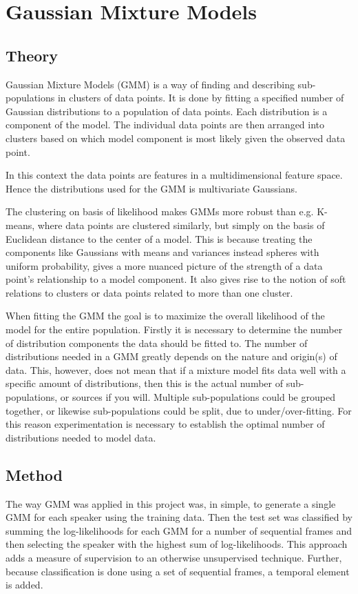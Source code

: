 \chapter{Gaussian Mixture Models}
\section{Theory}

Gaussian Mixture Models (GMM) is a way of finding and describing sub-populations in clusters of data points. 
It is done by fitting a specified number of Gaussian distributions to a population of data points.
Each distribution is a component of the model. 
The individual data points are then arranged into clusters based on which model component is most likely given the observed data point.

In this context the data points are features in a multidimensional feature space. Hence the distributions used for the GMM is multivariate Gaussians.

The clustering on basis of likelihood makes GMMs more robust than e.g. K-means, where data points are clustered similarly, but simply on the basis of Euclidean distance to the center of a model. 
This is because treating the components like Gaussians with means and variances instead spheres with uniform probability, gives a more nuanced picture of the strength of a data point’s relationship to a model component. 
It also gives rise to the notion of soft relations to clusters or data points related to more than one cluster.

When fitting the GMM the goal is to maximize the overall likelihood of the model for the entire population.
Firstly it is necessary to determine the number of distribution components the data should be fitted to. 
The number of distributions needed in a GMM greatly depends on the nature and origin(s)
of data.
This, however, does not mean that if a mixture model fits data well with a specific amount of distributions, then this is the actual number of sub-populations, or sources if you will.
Multiple sub-populations could be grouped together, or likewise sub-populations could be split, due to under/over-fitting.
For this reason experimentation is necessary to establish the optimal number of distributions needed to model data.




\section{Method}
The way GMM was applied in this project was, in simple, to generate a single GMM for each speaker using the training data.
Then the test set was classified by summing the log-likelihoods for each GMM for a number of sequential frames and then selecting the speaker with the highest sum of log-likelihoods.
This approach adds a measure of supervision to an otherwise unsupervised technique.
Further, because classification is done using a set of sequential frames, a temporal element is added.

